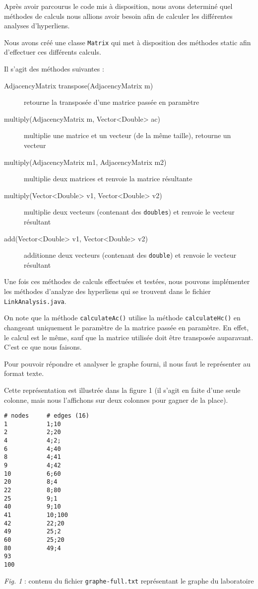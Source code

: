 \documentclass[a4paper, 11pt]{article}
\begin{document}
Après avoir parcourus le code mis à disposition, nous avons determiné
quel méthodes de calculs nous allions avoir besoin afin de calculer les
différentes analyses d'hyperliens. 

Nous avons créé une classe \texttt{Matrix} qui met à disposition des méthodes
static afin d'effectuer ces différents calculs.

Il s'agit des méthodes suivantes : 

\begin{description}
\item[AdjacencyMatrix transpose(AdjacencyMatrix m)] retourne la transposée
d'une matrice passée en paramètre
\item[multiply(AdjacencyMatrix m, Vector<Double> ac)] multiplie
une matrice et un vecteur (de la même taille), retourne un vecteur
\item[multiply(AdjacencyMatrix m1, AdjacencyMatrix m2)] multiplie deux matrices
et renvoie la matrice résultante
\item[multiply(Vector<Double> v1, Vector<Double> v2)] multiplie deux vecteurs
(contenant des \texttt{doubles}) et renvoie le vecteur résultant
\item[add(Vector<Double> v1, Vector<Double> v2)] additionne deux vecteurs
(contenant des \texttt{double}) et renvoie le vecteur résultant
\end{description}

Une fois ces méthodes de calculs effectuées et testées, nous pouvons implémenter
les méthodes d'analyze des hyperliens qui se trouvent dans le fichier
\texttt{LinkAnalysis.java}.

On note que la méthode \texttt{calculateAc()} utilise la méthode
\texttt{calculateHc()} en changeant uniquement le paramètre de la matrice
passée en paramètre. En effet, le calcul est le même, sauf que la matrice
utilisée doit être transposée auparavant. C'est ce que nous faisons.

Pour pouvoir répondre et analyser le graphe fourni, il nous faut le représenter
au format texte. 

Cette représentation est illustrée dans la figure 1 (il s'agit en faite d'une seule colonne, mais nous l'affichons sur deux colonnes pour gagner de la place).

\begin{lstlisting}
# nodes     # edges (16)
1           1;10
2           2;20
4           4;2;
6           4;40
8           4;41
9           4;42
10          6;60
20          8;4
22          8;80
25          9;1
40          9;10
41          10;100
42          22;20
49          25;2
60          25;20
80          49;4
93
100
\end{lstlisting}
\begin{center}
	\emph{Fig. 1} : contenu du fichier \texttt{graphe-full.txt} représentant le graphe du laboratoire
\end{center}
\end{document}
